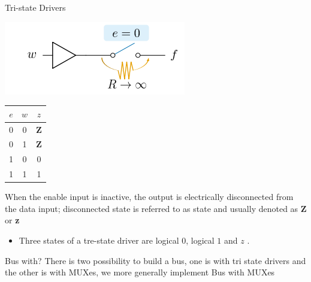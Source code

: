 \begin{parag}{Tri-state Drivers}
    \begin{center}
        \includegraphics[scale=0.4]{132025-06-20.png}
    \end{center}
    \begin{center} \begin{tabular}{cc|c}$e$ & $w$ &  $z$\\  \hline 0& 0 &\textbf{Z}  \\  0& 1 &\textbf{Z}  \\ 1 & 0 & 0 \\  1& 1 &1  \end{tabular} \end{center} 
    When the enable input is inactive, the output is electrically disconnected from the data input; disconnected state is referred to as  state and usually denoted as \textbf{Z} or \textbf{z}
    \begin{itemize}
        \item Three states of a tre-state driver are logical $0$, logical $1$ and $z$  .
    \end{itemize}
    
\end{parag}
\begin{parag}{Bus with?}
    There is two possibility to build a bus, one is with tri state drivers and the other is with MUXes, we more generally implement Bus with MUXes
    
\end{parag}

















